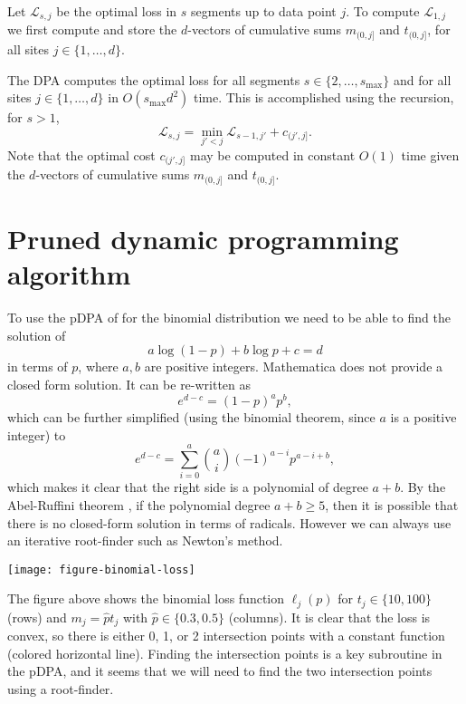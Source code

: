 \documentclass[12pt]{article}
\begin{document}
Let $\mathcal L_{s,j}$ be the optimal loss in $s$ segments up to data
point $j$. To compute $\mathcal L_{1, j}$ we first compute and store
the $d$-vectors of cumulative sums $m_{(0, j]}$ and $t_{(0, j]}$, for
all sites $j\in\{1, \dots, d\}$.

The DPA computes the optimal loss for all segments $s\in\{2, \dots,
s_{\text{max}} \}$ and for all sites $j\in\{1, \dots, d\}$ in
$O(s_{\text{max}} d^2)$ time. This is accomplished using the
recursion, for $s>1$,
\begin{equation}
  \label{eq:dpa-recursion}
  \mathcal L_{s, j} = 
  \min_{j' < j}
  \mathcal L_{s-1, j'}
  + 
  c_{(j', j]}.
\end{equation}
Note that the optimal cost $c_{(j', j]}$ may be computed in constant
$O(1)$ time given the $d$-vectors of cumulative sums $m_{(0, j]}$ and
$t_{(0, j]}$.

\section{Pruned dynamic programming algorithm}

To use the pDPA of \citet{pruned-dp} for the binomial distribution we
need to be able to find the solution of
\begin{equation}
  \label{eq:pDPA-intervals}
  a \log(1-p) + b \log p + c = d
\end{equation}
in terms of $p$, where $a,b$ are positive integers. Mathematica does
not provide a closed form solution. It can be re-written as
\begin{equation}
  \label{eq:pDPA-interval-factorized}
  e^{d-c} = (1-p)^a p^b,
\end{equation}
which can be further simplified (using the binomial theorem, since $a$
is a positive integer) to
\begin{equation}
  \label{eq:pDPA-interval-polynomial}
  e^{d-c} = \sum_{i=0}^a \binom{a}{i} (-1)^{a-i} p^{a-i+b},
\end{equation}
which makes it clear that the right side is a polynomial of degree
$a+b$. By the Abel-Ruffini theorem \citep{Abel-Ruffini-wikipedia}, if
the polynomial degree $a+b\geq 5$, then it is possible that there is
no closed-form solution in terms of radicals. However we can always
use an iterative root-finder such as Newton's method.

\texttt{[image: figure-binomial-loss]}

The figure above shows the binomial loss function $\ell_j(p)$ for
$t_j\in\{10, 100\}$ (rows) and $m_j=\hat p t_j$ with $\hat p\in\{0.3,
0.5\}$ (columns). It is clear that the loss is convex, so there is
either 0, 1, or 2 intersection points with a constant function
(colored horizontal line). Finding the intersection points is a key
subroutine in the pDPA, and it seems that we will need to find the two
intersection points using a root-finder.
\end{document}
